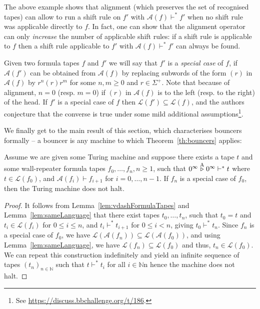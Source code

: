 The above example shows that alignment (which preserves the set of recognised tapes) can allow to run a shift rule on $f'$ with $\mathcal{A}(f) \vdash^* f'$ when no shift rule was applicable directly to $f$. In fact, one can show that the alignment operator can only \textit{increase} the number of applicable shift rules: if a shift rule is applicable to $f$ then a shift rule applicable to $f'$ with $\mathcal{A}(f) \vdash^* f'$ can always be found.

Given two formula tapes $f$ and $f'$ we will say that $f'$ is a \textit{special case} of $f$, if $\mathcal{A}(f')$ can be obtained from $\mathcal{A}(f)$ by replacing subwords of the form $(r)$ in $\mathcal{A}(f)$ by $r^n(r)r^m$ for some $n,m\geq 0$ and $r\in\Sigma^+$. Note that because of alignment, $n=0$ (resp. $m=0$) if $(r)$ in $\mathcal{A}(f)$ is to the left (resp. to the right) of the head. If $f'$ is a special case of $f$ then $\mathcal{L}(f') \subseteq \mathcal{L}(f)$, and the authors conjecture that the converse is true under some mild additional assumptions\footnote{See \url{https://discuss.bbchallenge.org/t/186}.}.

We finally get to the main result of this section, which characterises bouncers formally -- a bouncer is any machine to which Theorem~\ref{th:bouncers} applies:

\begin{theorem}[Bouncers]\label{th:bouncers}
    Assume we are given some Turing machine and suppose there exists a tape $t$ and some wall-repeater formula tapes $f_0,\dots,f_n, n\geq 1$, such that $0^\infty \stackrel{\text{A}}\triangleright 0^\infty \vdash^* t$ where $t \in \mathcal{L}(f_0)$, and $\mathcal{A}(f_i) \vdash f_{i+1}$ for $i=0,\dots,n-1$. If $f_n$ is a special case of $f_0$, then the Turing machine does not halt.
\end{theorem}

\begin{proof}
    It follows from Lemma~\ref{lem:vdashFormulaTapes} and Lemma~\ref{lem:sameLanguage} that there exist tapes $t_0, \dots, t_n$, such that $t_0 = t$ and $t_i\in \mathcal{L}(f_i)$ for $0 \leq i \leq n$, and $t_i \vdash^* t_{i+1}$ for $0 \leq i < n$, giving $t_0 \vdash^* t_n$. Since $f_n$ is a special case of $f_0$, we have $\mathcal{L}(\mathcal{A}(f_n)) \subseteq \mathcal{L}(\mathcal{A}(f_0))$, and using Lemma~\ref{lem:sameLanguage}, we have $\mathcal{L}(f_n) \subseteq \mathcal{L}(f_0)$ and thus, $t_n \in \mathcal{L}(f_0)$. We can repeat this construction indefinitely and yield an infinite sequence of tapes $(t_n)_{n\in\mathbb{N}}$ such that $t \vdash^* t_i$ for all $i\in\mathbb{N}$n hence the machine does not halt.
\end{proof}

